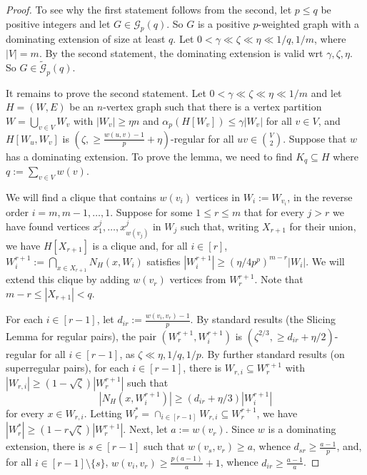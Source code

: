 \documentclass[11pt, a4paper]{article}
\theoremstyle{definition}
\def\eps{{\varepsilon}}
\newcommand{\cG}{\mathcal{G}}
\begin{document}
\begin{proof}
	To see why the first statement follows from the second, let $p \leq q$ be positive integers and
	let $G \in \cG_p(q)$. So $G$ is a positive $p$-weighted graph with a dominating extension of size at least $q$.
	Let $0 < \gamma \ll \zeta \ll \eta \ll 1/q,1/m$, where $|V|=m$.
	By the second statement, the dominating extension is valid wrt $\gamma,\zeta,\eta$. So $G \in \widetilde{\cG}_p(q)$.
	
	It remains to prove the second statement.
	Let $0 < \gamma \ll \zeta \ll \eta \ll 1/m$ and let $H = (W,E)$ be an $n$-vertex graph such that
	there is a vertex partition $W=\bigcup_{v \in V}W_v$ with $|W_v| \geq \eta n$ and $\alpha_p(H[W_v])\le \gamma|W_v|$ for all $v \in V$, and
	$H[W_u,W_v]$ is $(\zeta,\geq\!\frac{w(u,v)-1}{p}+\eta)$-regular for all $uv\in{V\choose 2}$.
	Suppose that $w$ has a dominating extension.
	To prove the lemma, we need to find $K_q \subseteq H$ where $q := \sum_{v \in V}w(v)$.
	
	
	We will find a clique that contains $w(v_i)$ vertices in $W_i:=W_{v_i}$, in the reverse order $i=m,m-1,\ldots,1$.
	Suppose for some $1 \leq r \leq m$ that for every $j > r$ we have found vertices $x_1^{j},\ldots,x_{w(v_j)}^j$ in $W_j$
	such that, writing $X_{r+1}$ for their union, we have $H[X_{r+1}]$ is a clique and, for all $i\in [r]$, $W_i^{r+1} := \bigcap_{x \in X_{r+1}}N_H(x,W_i)$ satisfies $|W_i^{r+1}| \geq (\eta/4p^p)^{m-r}|W_i|$.
	We will extend this clique by adding $w(v_r)$ vertices from $W_r^{r+1}$.
	Note that $m-r \leq |X_{r+1}| < q$.
	
	For each $i \in [r-1]$, let $d_{ir} := \frac{w(v_i,v_r)-1}{p}$.
	By standard results (the Slicing Lemma for regular pairs), the pair $(W_r^{r+1},W_i^{r+1})$ is $(\zeta^{2/3},\geq\!d_{ir}+\eta/2)$-regular for all $i \in [r-1]$, as $\zeta \ll \eta,1/q,1/p$.
	By further standard results (on superregular pairs), for each $i \in [r-1]$, there is $W_{r,i} \subseteq W_r^{r+1}$   
	with $|W_{r,i}| \geq (1-\sqrt{\zeta})|W_r^{r+1}|$ such that
	$$
	|N_H(x,W_i^{r+1})| \geq (d_{ir}+\eta/3)|W_i^{r+1}| %
	$$
	for every $x \in W_{r,i}$.
	Letting $W_r^*=\cap_{i\in[r-1]}W_{r,i} \subseteq W_r^{r+1}$, we have  $|W_r^*| \geq (1-r\sqrt{\zeta})|W_r^{r+1}|$. 
	Next, let $a:= w(v_r)$. 
	Since $w$ is a dominating extension, there is $s \in [r-1]$ such that $w(v_s,v_r) \geq a$, whence $d_{sr} \geq \frac{a-1}{p}$, and, for all $i \in [r-1]\setminus\lbrace s\rbrace$, $w(v_i,v_r) \geq \frac{p(a-1)}{a}+1$, whence $d_{ir}\ge \frac{a-1}{a}$.
	

\end{proof}
\end{document}
